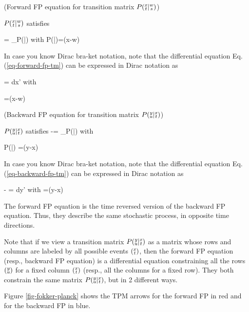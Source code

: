 \begin{claim} (Forward FP equation for transition matrix $ P({\substack{x\\t}}|{\substack{w\\s}})$)

$ P({\substack{x\\t}}|{\substack{w\\s}})$ satisfies
	
\beq
{}=
\calf_\rvx P(|)
\label{eq-forward-fp-tm}
\eeq
with
\beq
P(|)=\delta(x-w)
\eeq

In case you know Dirac bra-ket notation,
note that the
differential
equation Eq.(\ref{eq-forward-fp-tm})
 can be expressed in Dirac notation as

\beq
{}
=\int
{}dx'
\eeq
with

\beq
{} =\delta(x-w)
\quad {}
\eeq
\end{claim}


	
	
\begin{claim} (Backward FP equation for transition matrix $P({\substack{y\\u}}|{\substack{x\\t}})$)

$P({\substack{y\\u}}|{\substack{x\\t}})$ satisfies
\beq
-\;=
\calb_\rvx P(|)
\label{eq-backward-fp-tm}
\eeq
with

\beq
P(|) =\delta(y-x)
\eeq

In case you know Dirac bra-ket notation,
note that the
differential
equation Eq.(\ref{eq-backward-fp-tm})
 can be expressed in Dirac notation as

\beq
-\; 
=\int
{}dy'
\eeq
with
\beq
{}=\delta(y-x)
\quad {}
\eeq
	
\end{claim}

The forward FP equation is the
time reversed version of the
backward FP equation. Thus, they describe
the same stochastic process,
in opposite time directions.

Note that if we view
a transition matrix
$P({\substack{y\\u}}|{\substack{x\\t}})$  as a matrix whose rows and columns are labeled by
all possible events $({\substack{x\\t}})$, then the forward FP equation (resp., backward FP equation)
is a differential equation
constraining all the rows $({\substack{y\\u}})$ for a fixed column
$({\substack{x\\t}})$
(resp., all the columns for a fixed row).
They both constrain
the same matrix $P({\substack{y\\u}}|{\substack{x\\t}})$,
but in 2 different ways.

Figure \ref{fig-fokker-planck}
shows the TPM arrows for the
forward FP
in red and for the
backward FP in blue.


